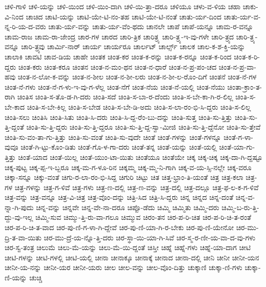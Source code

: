 {ಚಳಿ-ಗಾಳಿ
ಚಳಿ-ಯನ್ನು
ಚಳಿ-ಯಿಂದ
ಚಳಿ-ಯಿಂ-ದಾಗಿ
ಚಳಿ-ಯಿ-ತ್ತಾ-ದರೂ
ಚಳಿಯೂ
ಚಳು-ವ-ಳಿಯ
ಚಹಾ
ಚಾಕು-ವಿ-ನಿಂದ
ಚಾಚಿದ
ಚಾಟಿ-ಯನ್ನು
ಚಾಟಿ-ಯೇ-ಟಿ-ನಂ-ತಹ
ಚಾಟಿ-ಯೇ-ಟಿ-ನಂತೆ
ಚಾತು-ರ್ಯ-ದಿಂದ
ಚಾತು-ರ್ಯ-ವ-ನ್ನ-ರಿ-ಯ-ದ-ವರು
ಚಾತು-ರ್ಯ-ವನ್ನು
ಚಾತು-ರ್ಯ-ವೆಂ-ಥದು
ಚಾನಲೇ
ಚಾಪೆ
ಚಾಪೆ-ಯನ್ನೂ
ಚಾಮ-ರ-ವನ್ನೂ
ಚಾಮ-ರಾಜ
ಚಾಮ-ರಾ-ಜೇಂದ್ರ
ಚಾರ-ಗಳ
ಚಾರದ
ಚಾರಿ-ತ್ರಿಕ
ಚಾರಿತ್ರ್ಯ
ಚಾರಿ-ತ್ರ್ಯ-ಇ-ವು-ಗಳೇ
ಚಾರಿ-ತ್ರ್ಯದ
ಚಾರಿ-ತ್ರ್ಯ-ವನ್ನೂ
ಚಾರಿ-ತ್ರ್ಯವು
ಚಾರ್ಮಿ-ನಾರ್
ಚಾರ್ಯ
ಚಾರ್ಯರೂ
ಚಾರ್ಲಟ್
ಚಾರ್ಲ್ಸ್
ಚಾಲಕ
ಚಾಲ-ಕ-ಶ-ಕ್ತಿ-ಯನ್ನು
ಚಾಲಾಕಿ
ಚಾವಟಿ
ಚಾವ-ಡಿಯ
ಚಾಹೇ
ಚಿಂತಕ
ಚಿಂತ-ಕರ
ಚಿಂತ-ಕ-ರನ್ನು
ಚಿಂತ-ಕ-ರನ್ನೂ
ಚಿಂತ-ಕ-ರಿಂದ
ಚಿಂತ-ಕ-ರಿ-ದ್ದರು
ಚಿಂತ-ಕರು
ಚಿಂತ-ಕರೂ
ಚಿಂತನ
ಚಿಂತ-ನ-ಮಂ-ಥನ
ಚಿಂತ-ನ-ಧಾರೆ
ಚಿಂತ-ನ-ಪ್ರ-ಪಂ-ಚದ
ಚಿಂತ-ನ-ಪ್ರ-ವಾ-ಹವು
ಚಿಂತ-ನ-ಲೋ-ಕ-ವನ್ನು
ಚಿಂತ-ನ-ಶೀಲ
ಚಿಂತ-ನ-ಶೀ-ಲರು
ಚಿಂತ-ನ-ಶೀ-ಲ-ರೊಂ-ದಿಗೆ
ಚಿಂತನೆ
ಚಿಂತ-ನೆ-ಗಳ
ಚಿಂತ-ನೆ-ಗಳು
ಚಿಂತ-ನೆ-ಗ-ಳು-ಇ-ವು-ಗ-ಳೆಲ್ಲ
ಚಿಂತ-ನೆಗೆ
ಚಿಂತ-ನೆಯ
ಚಿಂತ-ನೆ-ಯಲ್ಲಿ
ಚಿಂತ-ನೆಯು
ಚಿಂತಾ-ಕ್ರಾಂ-ತ-ರಾಗಿ
ಚಿಂತಿಸ
ಚಿಂತಿ-ಸ-ತೊ-ಡ-ಗಿ-ದರು
ಚಿಂತಿ-ಸದೆ
ಚಿಂತಿ-ಸ-ಬಾ-ರ-ದೆಂದು
ಚಿಂತಿ-ಸ-ಬೇ-ಕಾ-ಗಿ-ರ-ಲಿಲ್ಲ
ಚಿಂತಿ-ಸ-ಬೇ-ಕಾದ
ಚಿಂತಿ-ಸ-ಬೇ-ಕಿಲ್ಲ
ಚಿಂತಿ-ಸ-ಬೇಡ
ಚಿಂತಿ-ಸ-ಬೇ-ಡಿ-ಅದು
ಚಿಂತಿ-ಸ-ಲಾ-ರಂ-ಭಿ-ಸಿ-ದ್ದರು
ಚಿಂತಿ-ಸ-ಲಿಲ್ಲ
ಚಿಂತಿ-ಸಲು
ಚಿಂತಿಸಿ
ಚಿಂತಿ-ಸಿತು
ಚಿಂತಿ-ಸಿ-ದರು
ಚಿಂತಿ-ಸಿ-ದ್ದ-ರೆಂ-ಬು-ದನ್ನು
ಚಿಂತಿ-ಸುತ್ತ
ಚಿಂತಿ-ಸು-ತ್ತಿತ್ತು
ಚಿಂತಿ-ಸು-ತ್ತಿ-ದ್ದಂತೆ
ಚಿಂತಿ-ಸು-ತ್ತಿ-ದ್ದರು
ಚಿಂತಿ-ಸು-ತ್ತಿ-ದ್ದರೂ
ಚಿಂತಿ-ಸು-ತ್ತಿ-ದ್ದ-ಸ್ವಾ-ಮೀಜಿ
ಚಿಂತಿ-ಸು-ತ್ತಿ-ದ್ದೆನೋ
ಚಿಂತಿ-ಸು-ತ್ತೇವೆ
ಚಿಂತಿ-ಸು-ವಂ-ತಾ-ಗು-ತ್ತಿತ್ತು
ಚಿಂತಿ-ಸು-ವಂತೆ
ಚಿಂತಿ-ಸು-ವುದೇ
ಚಿಂತೆ
ಚಿಂತೆ-ಗಳನ್ನು
ಚಿಂತೆ-ಗಳನ್ನೂ
ಚಿಂತೆ-ಗ-ಳಾ-ವುವೂ
ಚಿಂತೆ-ಗಿ-ಟ್ಟು-ಕೊಂ-ಡಿತು
ಚಿಂತೆ-ಗೊ-ಳ-ಗಾ-ದರು
ಚಿಂತೆ-ತನ್ನ
ಚಿಂತೆ-ಯನ್ನು
ಚಿಂತೆ-ಯಲ್ಲಿ
ಚಿಂತೆ-ಯಾ-ಗು-ತ್ತಿತ್ತು
ಚಿಂತೆ-ಯಾದ
ಚಿಂತೆ-ಯಿಲ್ಲ
ಚಿಂತೆ-ಯುಂ-ಟಾ-ಯಿತು
ಚಿಂತೆಯೂ
ಚಿಂತೆಯೇ
ಚಿಕ್ಕ
ಚಿಕ್ಕ-ಚಿಕ್ಕ
ಚಿಕ್ಕ-ದಾ-ಗಿ-ದ್ದಷ್ಟೂ
ಚಿಕ್ಕ-ಪುಟ್ಟ
ಚಿಕ್ಕ-ಪ್ಪ-ಇ-ಬ್ಬರೂ
ಚಿಕ್ಕ-ಮ-ಗ-ಳೂ-ರಿನ
ಚಿಕ್ಕಮ್ಮ
ಚಿಕ್ಕ-ಮ್ಮ-ನಿ-ಗಾಗಿ
ಚಿಕ್ಕ-ವ-ಯ-ಸ್ಸಿ-ನಲ್ಲೇ
ಚಿಕ್ಕ-ವರೂ
ಚಿಕ್ಕಾ-ಸನ್ನೂ
ಚಿಕ್ಕು-ವಂತೆ
ಚಿಗು-ರ-ಲಾ-ರಂ-ಭಿ-ಸಿದ್ದ
ಚಿಗುರಿ
ಚಿಟ್ಟು
ಚಿತ
ಚಿತ್ತ-ಭ್ರಾಂ-ತಿ-ಯಂತೆ
ಚಿತ್ರ
ಚಿತ್ರ-ಕಲಾ
ಚಿತ್ರ-ಗಳ
ಚಿತ್ರ-ಗಳನ್ನು
ಚಿತ್ರ-ಗ-ಳಿವೆ
ಚಿತ್ರ-ಗಳು
ಚಿತ್ರ-ಣ-ದಲ್ಲಿ
ಚಿತ್ರ-ಣ-ವನ್ನು
ಚಿತ್ರ-ದಲ್ಲಿ
ಚಿತ್ರ-ದಲ್ಲೂ
ಚಿತ್ರ-ಫ-ಲ-ಕ-ಗ-ಳಿವೆ
ಚಿತ್ರ-ವನ್ನು
ಚಿತ್ರ-ವನ್ನೂ
ಚಿತ್ರ-ವಿ-ಚಿತ್ರ
ಚಿತ್ರ-ವೊಂ-ದನ್ನು
ಚಿತ್ರಿ-ಸಿದ
ಚಿತ್ರಿ-ಸಿ-ದ್ದರು
ಚಿನ್ನ
ಚಿನ್ನದ
ಚಿನ್ನ-ದಂತೆ
ಚಿನ್ನ-ವ-ನ್ನಾ-ಗಿ-ಪುದು
ಚಿನ್ನ-ವನ್ನು
ಚಿನ್ನವೇ
ಚಿನ್ನ-ವೇ-ನಾ-ದರೂ
ಚಿಪ್ಪೊ-ಡೆದು
ಚಿಮ್ಮಿ
ಚಿಮ್ಮಿತು
ಚಿಮ್ಮಿ-ದರು
ಚಿಮ್ಮಿ-ಬ-ರು-ತ್ತಿ-ದ್ದು-ವು-ಇಲ್ಲ
ಚಿಮ್ಮಿ-ಸುವ
ಚಿಮ್ಮು-ತ್ತಿ-ರು-ವಾ-ಗಲೂ
ಚಿಮ್ಮುವ
ಚಿರಂ-ತನ
ಚಿರ-ಪ-ರಿ-ಚಿತ
ಚಿರ-ಪ-ರಿ-ಚಿ-ತ-ರಂತೆ
ಚಿರ-ಪ-ರಿ-ಚಿ-ತ-ವಾದ
ಚಿರ-ಪು-ಣಿ-ಗ-ಳಾ-ಗಿ-ದ್ದೇವೆ
ಚಿರ-ಪು-ಣಿ-ಯಾ-ಗಿ-ರ-ಬೇಕು
ಚಿರ-ಪು-ಣಿ-ಯೇನೋ
ಚಿರ-ಮು-ದ್ರಿ-ತ-ವಾ-ಯಿತು
ಚಿರ-ಮು-ದ್ರೆ-ಯ-ನ್ನೊ-ತ್ತಿ-ದರು
ಚಿರ-ಸ್ಥಾ-ಯಿ-ಯಾ-ಗಿ-ಸಿವೆ
ಚಿರ-ಸ್ಮ-ರ-ಣೀ-ಯ-ವಾ-ದ-ವು-ಗಳು
ಚಿರ-ಸ್ವ-ತಂತ್ರ
ಚಿಲುಮೆ
ಚಿಲು-ಮೆ-ಯನ್ನು
ಚಿಲು-ಮೆ-ಯಿ-ದ್ದಂತೆ
ಚಿಸ್ತೀ
ಚಿಹ್ನೆ
ಚಿಹ್ನೆ-ಗಳು
ಚಿಹ್ನೆ-ಯಾ-ದಾಗ
ಚೀಟಿ
ಚೀಟಿ-ಗಳನ್ನು
ಚೀಟಿ-ಗಳಲ್ಲಿ
ಚೀಟಿ-ಯಲ್ಲಿ
ಚೀನಾ
ಚೀನಾಕ್ಕೂ
ಚೀನಾಕ್ಕೆ
ಚೀನಾದ
ಚೀನಾ-ದಲ್ಲಿ
ಚೀನಿ
ಚೀನೀ
ಚೀನೀ-ಯನ
ಚೀನೀ-ಯ-ನನ್ನು
ಚೀನೀ-ಯರ
ಚೀನೀ-ಯರು
ಚೀಲ
ಚೀಲ-ವನ್ನು
ಚೀಲ-ವೊಂ-ದಿತ್ತು
ಚುಕ್ಕಾಣಿ
ಚುಕ್ಕಾ-ಣಿ-ಗಳು
ಚುಕ್ಕಾ-ಣಿ-ಯನ್ನು
ಚುಚ್ಚಿ
}
